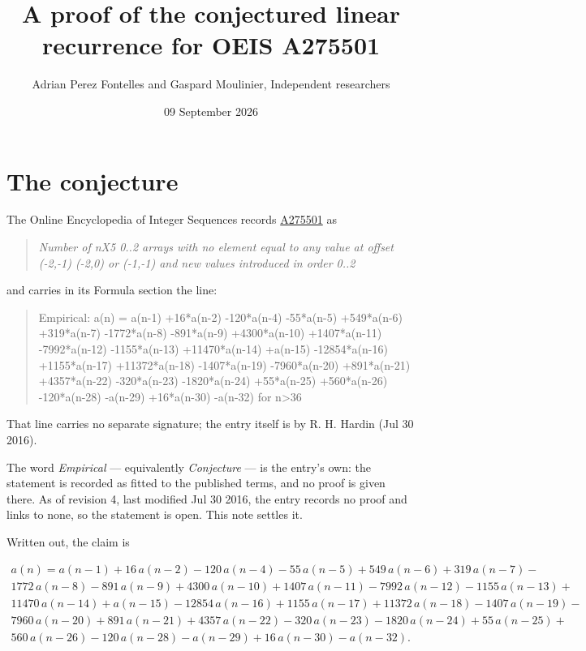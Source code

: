 \documentclass[11pt]{article}
\title{A proof of the conjectured linear recurrence for OEIS A275501}
\author{Adrian Perez Fontelles and Gaspard Moulinier, Independent researchers}
\date{09 September 2026}
\theoremstyle{definition}
\begin{document}
\maketitle
\section{The conjecture}

The Online Encyclopedia of Integer Sequences records \href{https://oeis.org/A275501}{A275501} as

\begin{quote}\itshape Number of nX5 0..2 arrays with no element equal to any value at offset (-2,-1) (-2,0) or (-1,-1) and new values introduced in order 0..2\end{quote}

and carries in its Formula section the line:

\begin{quote}\ttfamily Empirical: a(n) = a(n-1) +16*a(n-2) -120*a(n-4) -55*a(n-5) +549*a(n-6) +319*a(n-7) -1772*a(n-8) -891*a(n-9) +4300*a(n-10) +1407*a(n-11) -7992*a(n-12) -1155*a(n-13) +11470*a(n-14) +a(n-15) -12854*a(n-16) +1155*a(n-17) +11372*a(n-18) -1407*a(n-19) -7960*a(n-20) +891*a(n-21) +4357*a(n-22) -320*a(n-23) -1820*a(n-24) +55*a(n-25) +560*a(n-26) -120*a(n-28) -a(n-29) +16*a(n-30) -a(n-32) for n>36\end{quote}

That line carries no separate signature; the entry itself is by R. H. Hardin (Jul 30 2016).

The word {\itshape Empirical} --- equivalently {\itshape Conjecture} --- is the entry's own: the statement is recorded as fitted to the published terms, and no proof is given there. As of revision 4, last modified Jul 30 2016, the entry records no proof and links to none, so the statement is open. This note settles it.

Written out, the claim is

\begin{multline*} a(n) = a(n-1) + 16\,a(n-2) - 120\,a(n-4) - 55\,a(n-5) + 549\,a(n-6) + 319\,a(n-7) - \\ 1772\,a(n-8) - 891\,a(n-9) + 4300\,a(n-10) + 1407\,a(n-11) - 7992\,a(n-12) - 1155\,a(n-13) + \\ 11470\,a(n-14) + a(n-15) - 12854\,a(n-16) + 1155\,a(n-17) + 11372\,a(n-18) - 1407\,a(n-19) - \\ 7960\,a(n-20) + 891\,a(n-21) + 4357\,a(n-22) - 320\,a(n-23) - 1820\,a(n-24) + 55\,a(n-25) + \\ 560\,a(n-26) - 120\,a(n-28) - a(n-29) + 16\,a(n-30) - a(n-32). \end{multline*}
\end{document}
